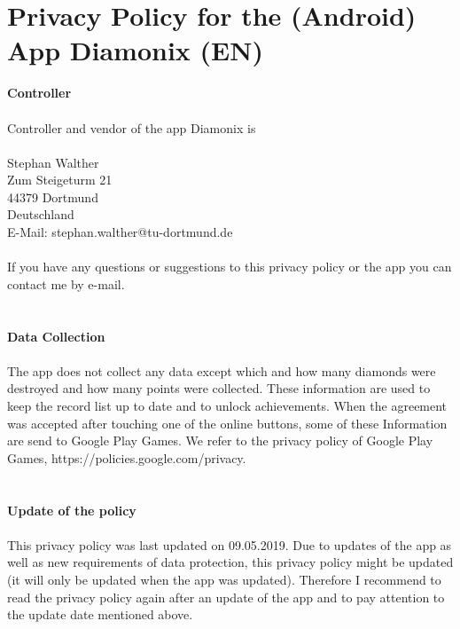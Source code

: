 \documentclass[a4paper,12pt]{article}
\makeatletter
\renewcommand\tableofcontents{%
    \@starttoc{toc}%
}
\makeatother
\begin{document}
\tableofcontents
\clearpage

\section{Privacy Policy for the (Android) App Diamonix (EN)}\normalsize
\bigskip
\textbf{Controller} \\
\\
Controller and vendor of the app Diamonix is \\
\\
Stephan Walther \\
Zum Steigeturm 21 \\
44379 Dortmund \\
Deutschland \\
E-Mail: stephan.walther@tu-dortmund.de \\ 
\\
If you have any questions or suggestions to this privacy policy or the app you can
contact me by e-mail. \\
\\
\\
\textbf{Data Collection} \\
\\
The app does not collect any data except which and how many diamonds were destroyed and
how many points were collected. These information are used to keep the record list
up to date and to unlock achievements. When the agreement was accepted after touching
one of the online buttons, some of these Information are send to Google Play Games.
We refer to the privacy policy of Google Play Games, https://policies.google.com/privacy. \\
\\
\\
\textbf{Update of the policy} \\
\\
This privacy policy was last updated on 09.05.2019.
Due to updates of the app as well as new requirements of data protection, this privacy policy might be updated (it will only be updated when the app was updated). Therefore I recommend to read the privacy policy again after an update of the app and to pay attention to the update date mentioned above.


\clearpage
\setcounter{equation}{0} 
\end{document}
